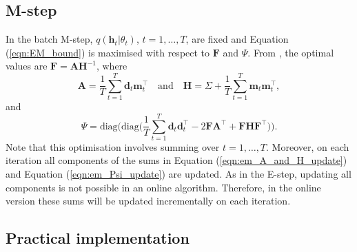 \documentclass[msc,deptreport.inf]{infthesis} %
\newcommand{\matr}[1]{\mathbf{#1}}
\begin{document}
\subsection{M-step}

In the batch M-step, $q(\matr{h}_t | \theta_t)$, $t=1,\dots,T$, are fixed and Equation (\ref{eqn:EM_bound}) is maximised with respect to $\matr{F}$ and $\Psi$. From \cite{barber2007}, the optimal values are $\matr{F} = \matr{A}\matr{H}^{-1}$, where
\begin{equation}\label{eqn:em_A_and_H_update}
	\matr{A} = \frac{1}{T} \sum_{t=1}^T \matr{d}_t \matr{m}_t^\intercal \quad \text{and} \quad 
	\matr{H} = \Sigma + \frac{1}{T} \sum_{t=1}^T \matr{m}_t \matr{m}_t^\intercal,
\end{equation}
and
\begin{equation}\label{eqn:em_Psi_update}
	\Psi = \text{diag}\Bigg(\text{diag}\Bigg( \frac{1}{T} \sum_{t=1}^T \matr{d}_t \matr{d}_t^\intercal - 2\matr{FA}^\intercal + \matr{FHF}^\intercal \Bigg)\Bigg).
\end{equation}
Note that this optimisation involves summing over $t=1,\dots,T$. Moreover, on each iteration all components of the sums in Equation (\ref{eqn:em_A_and_H_update}) and Equation (\ref{eqn:em_Psi_update}) are updated. As in the E-step, updating all components is not possible in an online algorithm. Therefore, in the online version these sums will be updated incrementally on each iteration. 

\subsection{Practical implementation}
\end{document}

